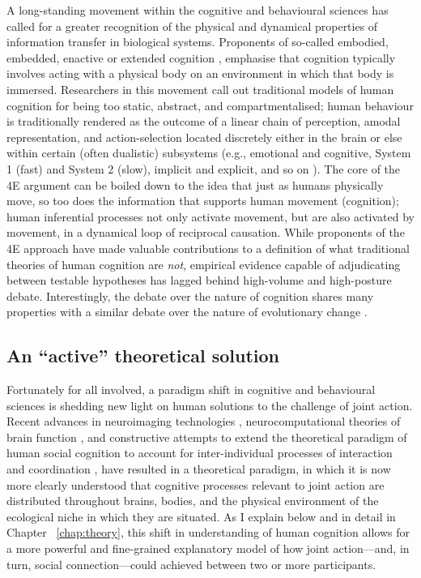 \begin{CJK}{UTF8}{gbsn}
A long-standing movement within the cognitive and behavioural sciences has called for a greater recognition of the physical and dynamical properties of information transfer in biological systems.  Proponents of so-called embodied, embedded, enactive or extended cognition \citep[now collectively referred to as ``4E cognition,'' see][]{Menary2010}, emphasise that cognition typically involves acting with a physical body on an environment in which that body is immersed. Researchers in this movement call out traditional models of human cognition for being too static, abstract, and compartmentalised; human behaviour is traditionally rendered as the outcome of a linear chain of perception, amodal representation, and action-selection located discretely either in the brain or else within certain (often dualistic) subsystems (e.g., emotional and cognitive, System 1 (fast) and System 2 (slow), implicit and explicit, and so on \citep[cf.][]{Diennes1999,Kahneman2011}).  The core of the 4E argument can be boiled down to the idea that just as humans physically move, so too does the information that supports human movement (cognition); human inferential processes not only activate movement, but are also activated by movement, in a dynamical loop of reciprocal causation.  While proponents of the 4E approach have made valuable contributions to a definition of what traditional theories of human cognition are \textit{not}, empirical evidence capable of adjudicating between testable hypotheses has lagged behind high-volume and high-posture  debate.  Interestingly, the debate over the nature of cognition shares many properties with a similar debate over the nature of evolutionary change \citep{Nowak2010,Scott-Phillips2011,Laland2014,Fuentes2016}.

\subsection{An ``active'' theoretical solution}
Fortunately for all involved, a paradigm shift in cognitive and behavioural sciences is shedding new light on human solutions to the challenge of joint action.  Recent advances in neuroimaging technologies \citep{Frith2007}, neurocomputational theories of brain function \citep{Friston2010,Frith2010,Yufik2013,Clark2013}, and constructive attempts to extend the theoretical paradigm of human social cognition to account for inter-individual processes of interaction and coordination \citep{Sebanz2006,Dale2014}, have resulted in a theoretical paradigm, in which it is now more clearly understood that cognitive processes relevant to joint action are distributed throughout brains, bodies, and the physical environment of the ecological niche in which they are situated.  As I explain below and in detail in Chapter ~\ref{chap:theory}, this shift in understanding of human cognition allows for a more powerful and fine-grained explanatory model of how joint action---and, in turn, social connection---could achieved between two or more participants.


\end{CJK}
